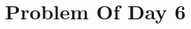 \documentclass{article}
\newcommand{\YearPath}{../../../LatexConfig} %
\newcommand{\SemesterPath}{../../LatexConfig} %
\newcommand{\ClassPath}{../LatexConfig} %
\begin{document}




\section{Problem Of Day 6}

\end{document}
